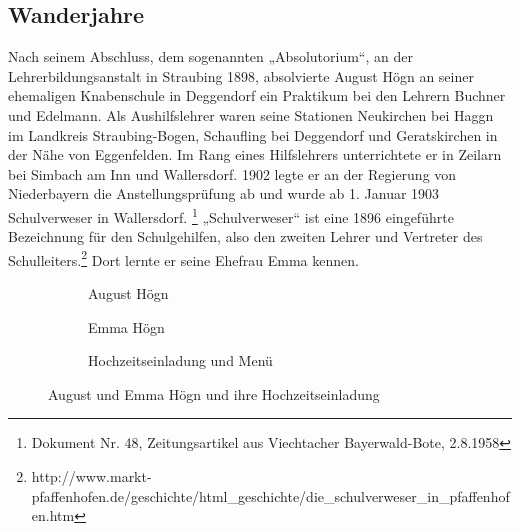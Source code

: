 \subsection{Wanderjahre}

Nach seinem Abschluss, dem
sogenannten „Absolutorium“, an der Lehrerbildungsanstalt in Straubing
1898, absolvierte August Högn an seiner ehemaligen Knabenschule in
Deggendorf ein Praktikum bei den Lehrern Buchner und Edelmann. Als
Aushilfslehrer waren seine Stationen Neukirchen bei Haggn im Landkreis
Straubing-Bogen, Schaufling bei Deggendorf und Geratskirchen in der
Nähe von Eggenfelden. Im Rang eines Hilfslehrers unterrichtete er in
Zeilarn bei Simbach am Inn und Wallersdorf. 1902 legte er an der
Regierung von Niederbayern die Anstellungsprüfung ab und wurde ab 1.
Januar 1903 Schulverweser in Wallersdorf. \footnote{Dokument Nr. 48,
Zeitungsartikel aus Viechtacher Bayerwald-Bote, 2.8.1958}
„Schulverweser“ ist eine 1896 eingeführte Bezeichnung für den
Schulgehilfen, also den zweiten Lehrer und Vertreter des
Schulleiters.\footnote{
http://www.markt-pfaffenhofen.de/geschichte/html\_geschichte/die\_schulverweser\_in\_pfaffenhofen.htm}
Dort lernte er seine Ehefrau Emma kennen.

\begin{figure}
%
\begin{subfigure}[b]{0.3\linewidth}
\centering
{}
\caption{August Högn}
\end{subfigure}
%
\begin{subfigure}[b]{0.3\linewidth}
\centering
{}
\caption{Emma Högn}
\end{subfigure}
%
\begin{subfigure}[b]{0.3\linewidth}
\centering
{}
\caption{Hochzeitseinladung und Menü}
\end{subfigure}
%
\caption{August und Emma Högn und ihre Hochzeitseinladung}
\end{figure}


